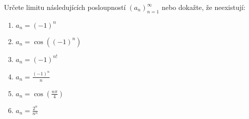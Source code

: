 Určete limitu následujících posloupností $(a_n)_{n=1}^{\infty}$ nebo dokažte, že neexistují:
\begin{enumerate}
	\item  $a_n = (-1)^n$
	\item  $a_n = \cos((-1)^n)$
	\item  $a_n = (-1)^{n!}$
	\item  $a_n = \frac{(-1)^n}{n}$
	\item  $a_n = \cos(\frac{n \pi}{4})$
	\item  $a_n = \frac{2^n}{n^n}$
\end{enumerate}

